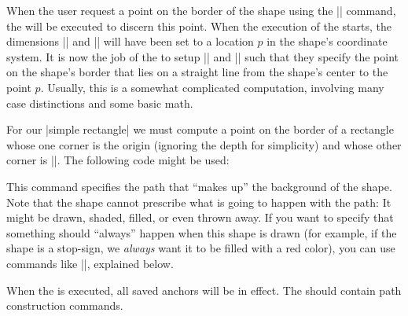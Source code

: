 \begin{command}{\pgfdeclareshape{}}
\begin{command}{\anchorborder{}}
    When the user request a point on the border of the shape using the
    |\pgfpointshapeborder| command, the  will be executed
    to discern this point. When the execution of  the 
    starts, the dimensions |\pgf@x| and |\pgf@y| will have been set to
    a location $p$ in the shape's coordinate system. It is now the job of
    the  to setup |\pgf@x| and |\pgf@y| such that they
    specify the point on the shape's border that lies on a straight
    line from the shape's center to the point $p$. Usually, this is a
    somewhat complicated computation, involving many case distinctions
    and some basic math.

    For our |simple rectangle| we must compute a point on the border
    of a rectangle whose one corner is the origin (ignoring the depth
    for simplicity) and whose other corner is |\upperrightcorner|. The
    following code might be used:
\begin{codeexample}
\anchorborder{%
  \@tempdima=\pgf@x
  \@tempdimb=\pgf@y
  \pgfpointborderrectangle{\pgfpoint{\@tempdima}{\@tempdimb}}{\upperrightcorner}
}
\end{codeexample}
  \end{command}  
  \begin{command}{\backgroundpath{}}
    This command specifies the path that ``makes up'' the background
    of the shape. Note that the shape cannot prescribe what is going
    to happen with the path: It might be drawn, shaded, filled, or
    even thrown away. If you want to specify that something should
    ``always'' happen when this shape is drawn (for example, if the
    shape is a stop-sign, we \emph{always} want it to be filled with a
    red color), you can use commands like |\beforebackgroundpath|,
    explained below.

    When the  is executed, all saved anchors will be in
    effect. The  should contain path construction
    commands.


\end{command}
\end{command}
